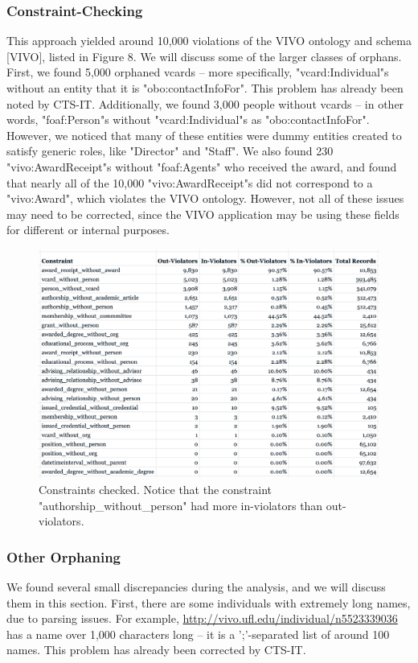 \documentclass[11pt]{article}
\begin{document}
\pagebreak
\subsubsection*{Constraint-Checking}
This approach yielded around 10,000 violations of the VIVO ontology and schema [VIVO], listed in Figure 8. We will discuss some of the larger classes of orphans. First, we found 5,000 orphaned vcards -- more specifically, "vcard:Individual"s without an entity that it is "obo:contactInfoFor". This problem has already been noted by CTS-IT. Additionally, we found 3,000 people without vcards -- in other words, "foaf:Person"s without "vcard:Individual"s as "obo:contactInfoFor". However, we noticed that many of these entities were dummy entities created to satisfy generic roles, like "Director" and "Staff". We also found 230 "vivo:AwardReceipt"s without "foaf:Agents" who received the award, and found that nearly all of the 10,000 "vivo:AwardReceipt"s did not correspond to a "vivo:Award", which violates the VIVO ontology. However, not all of these issues may need to be corrected, since the VIVO application may be using these fields for different or internal purposes.

\begin{figure}[h!]
\centering
\includegraphics[width=\textwidth]{violators.png}
\caption{Constraints checked. Notice that the constraint "authorship\_without\_person" had more in-violators than out-violators.}
\label{fig:output}
\end{figure}

\subsubsection*{Other Orphaning}
We found several small discrepancies during the analysis, and we will discuss them in this section. First, there are some individuals with extremely long names, due to parsing issues. For example, \url{http://vivo.ufl.edu/individual/n5523339036} has a name over 1,000 characters long -- it is a ';'-separated list of around 100 names. This problem has already been corrected by CTS-IT.
\end{document}
